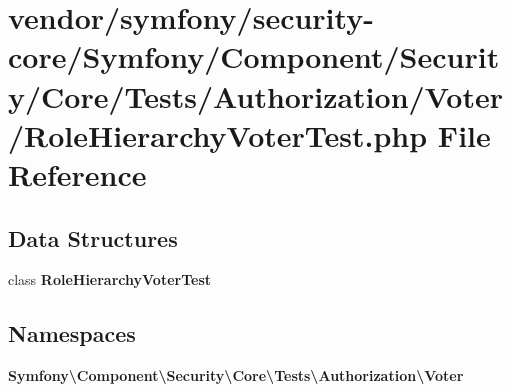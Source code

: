 \section{vendor/symfony/security-\/core/\+Symfony/\+Component/\+Security/\+Core/\+Tests/\+Authorization/\+Voter/\+Role\+Hierarchy\+Voter\+Test.php File Reference}
\label{_role_hierarchy_voter_test_8php}
\subsection*{Data Structures}
\begin{DoxyCompactItemize}
\item 
class {\bf Role\+Hierarchy\+Voter\+Test}
\end{DoxyCompactItemize}
\subsection*{Namespaces}
\begin{DoxyCompactItemize}
\item 
 {\bf Symfony\textbackslash{}\+Component\textbackslash{}\+Security\textbackslash{}\+Core\textbackslash{}\+Tests\textbackslash{}\+Authorization\textbackslash{}\+Voter}
\end{DoxyCompactItemize}
